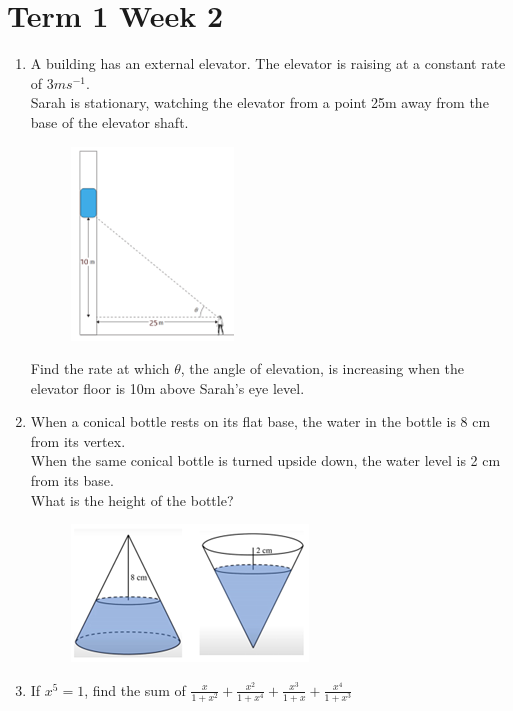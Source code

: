\documentclass[../main.tex]{subfiles}
\begin{document}
\section*{Term 1 Week 2}
\begin{enumerate}
    \item 
    A building has an external elevator. The elevator is raising at a constant rate of \(3 ms^{-1} \).\\
    Sarah is stationary, watching the elevator from a point 25m away from the base of the elevator shaft.\\
    \begin{figure}[h]
        \centering
        \includegraphics{../images/t1w1q1.png}
    \end{figure}
    
    Find the rate at which \(\theta\), the angle of elevation, is increasing when the elevator floor is 10m above Sarah’s eye level.
    \item 
    When a conical bottle rests on its flat base, the water in the bottle is 8 cm from its vertex.\\
    When the same conical bottle is turned upside down, the water level is 2 cm from its base.\\
    What is the height of the bottle?\\
    \begin{figure}[h]
        \centering
        \includegraphics{../images/t1w1q2.png}
    \end{figure}
    \item 
    If \(x^5=1\), find the sum of \(\frac{x}{1+x^2}+\frac{x^2}{1+x^4}+\frac{x^3}{1+x}+\frac{x^4}{1+x^3}\)
\end{enumerate}
\end{document}
